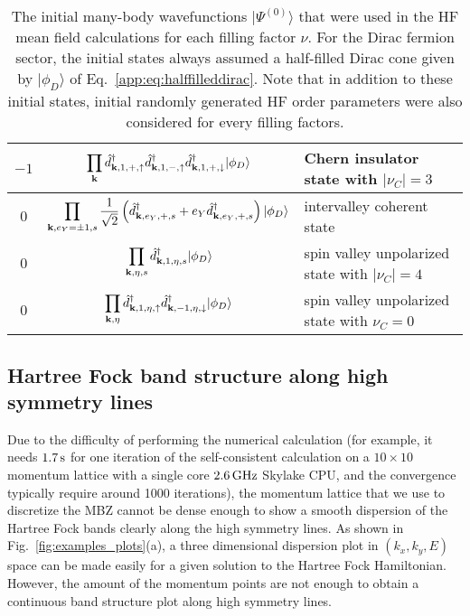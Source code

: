 \documentclass[prb,aps,nofootinbib,amssymb,twocolumn,superscriptaddress,10pt]{revtex4-2}
\begin{document}
\begin{widetext}
\begin{table}[h]
\begin{tabular}{c||c||l}
\hline
$-1$ & $\displaystyle \prod_{\mathbf{k}}\hat{d}^\dagger_{\mathbf{k},1,+,\uparrow}\hat{d}^\dagger_{\mathbf{k}, 1, -, \uparrow}\hat{d}^\dagger_{\mathbf{k},1, +, \downarrow}|\phi_D\rangle$ & Chern insulator state with $|\nu_C| = 3$\\
\hline
\hline
$0$ & $\displaystyle \prod_{\mathbf{k},e_Y=\pm1,s}\frac{1}{\sqrt2}\left(\hat{d}^\dagger_{\mathbf{k},e_Y, +, s} + e_Y \hat{d}^\dagger_{\mathbf{k},e_Y,+,s}\right) |\phi_D\rangle$ & intervalley coherent state\\
\hline
$0$ & $\displaystyle \prod_{\mathbf{k},\eta, s}\hat{d}^\dagger_{\mathbf{k}, 1, \eta, s}|\phi_D\rangle$ & spin valley unpolarized state with $|\nu_C| = 4$\\
\hline
$0$ & $\displaystyle \prod_{\mathbf{k},\eta}\hat{d}^\dagger_{\mathbf{k},1,\eta,\uparrow}\hat{d}^\dagger_{\mathbf{k},-1,\eta,\downarrow}|\phi_D\rangle$ & spin valley unpolarized state with $\nu_C = 0$ \\
\hline
\hline
\end{tabular}
\caption{The initial many-body wavefunctions $|\Psi^{(0)}\rangle$ that were used in the HF mean field calculations for each filling factor $\nu$. For the Dirac fermion sector, the initial states always assumed a half-filled Dirac cone given by $|\phi_D\rangle$ of Eq.~\ref{app:eq:halffilleddirac}. Note that in addition to these initial states, initial randomly generated HF order parameters were also considered for every filling factors.}
\label{tab:init}
\end{table}


\subsection{Hartree Fock band structure along high symmetry lines}\label{app_subsec:analysis}

Due to the difficulty of performing the numerical calculation (for example, it needs $1.7\rm\,s$ for one iteration of the self-consistent calculation on a $10\times 10$ momentum lattice with a single core $2.6\,\rm GHz$ Skylake CPU, and the convergence typically require around 1000 iterations), the momentum lattice that we use to discretize the MBZ cannot be dense enough to show a smooth dispersion of the Hartree Fock bands clearly along the high symmetry lines. As shown in Fig.~\ref{fig:examples_plots}(a), a three dimensional dispersion plot in $(k_x, k_y, E)$ space can be made easily for a given solution to the Hartree Fock Hamiltonian. However, the amount of the momentum points are not enough to obtain a continuous band structure plot along high symmetry lines. 


\end{widetext}
\end{document}

